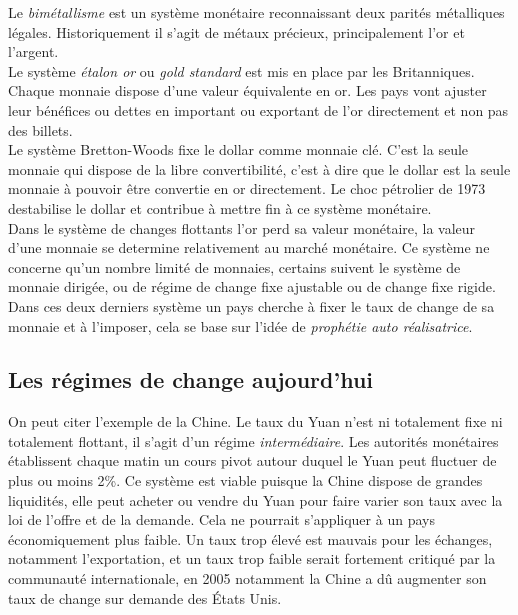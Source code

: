 \documentclass[main.tex]{subfiles}
\begin{document}
        Le \emph{bimétallisme} est un système monétaire reconnaissant deux parités métalliques légales. Historiquement il s'agit de métaux précieux, principalement l'or et l'argent. \\

        Le système \emph{étalon or} ou \emph{gold standard} est mis en place par les Britanniques. Chaque monnaie dispose d'une valeur équivalente en or. Les pays vont ajuster leur bénéfices ou dettes en important ou exportant de l'or directement et non pas des billets. \\

        Le système Bretton-Woods fixe le dollar comme monnaie clé. C'est la seule monnaie qui dispose de la libre convertibilité, c'est à dire que le dollar est la seule monnaie à pouvoir être convertie en or directement. Le choc pétrolier de 1973 destabilise le dollar et contribue à mettre fin à ce système monétaire. \\

        Dans le système de changes flottants l'or perd sa valeur monétaire, la valeur d'une monnaie se determine relativement au marché monétaire. Ce système ne concerne qu'un nombre limité de monnaies, certains suivent le système de monnaie dirigée, ou de régime de change fixe ajustable ou de change fixe rigide. Dans ces deux derniers système un pays cherche à fixer le taux de change de sa monnaie et à l'imposer, cela se base sur l'idée de \emph{prophétie auto réalisatrice}.

        \subsection{Les régimes de change aujourd'hui}
        On peut citer l'exemple de la Chine. Le taux du Yuan n'est ni totalement fixe ni totalement flottant, il s'agit d'un régime \emph{intermédiaire}. Les autorités monétaires établissent chaque matin un cours pivot autour duquel le Yuan peut fluctuer de plus ou moins 2\%. Ce système est viable puisque la Chine dispose de grandes liquidités, elle peut acheter ou vendre du Yuan pour faire varier son taux avec la loi de l'offre et de la demande. Cela ne pourrait s'appliquer à un pays économiquement plus faible. Un taux trop élevé est mauvais pour les échanges, notamment l'exportation, et un taux trop faible serait fortement critiqué par la communauté internationale, en 2005 notamment la Chine a dû augmenter son taux de change sur demande des États Unis.
\end{document}
